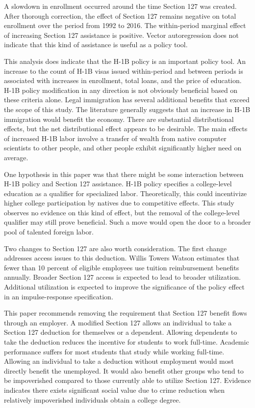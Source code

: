 \documentclass[review]{elsarticle}
\begin{document}

A slowdown in enrollment occurred around the time Section 127 was created.
After thorough correction, the effect of Section 127 remains negative on total enrollment over the period from 1992 to 2016.
The within-period marginal effect of increasing Section 127 assistance is positive.
Vector autoregression does not indicate that this kind of assistance is useful as a policy tool.

This analysis does indicate that the H-1B policy is an important policy tool.
An increase to the count of H-1B visas issued within-period and between periods is associated with increases in enrollment, total loans, and the price of education.
H-1B policy modification in any direction is not obviously beneficial based on these criteria alone.
Legal immigration has several additional benefits that exceed the scope of this study.
The literature generally suggests that an increase in H-1B immigration would benefit the economy\cite{bound2017understanding}.
There are substantial distributional effects, but the net distributional effect appears to be desirable.
The main effects of increased H-1B labor involve a transfer of wealth from native computer scientists to other people,
and other people exhibit significantly higher need on average.

One hypothesis in this paper was that there might be some interaction between H-1B policy and Section 127 assistance.
H-1B policy specifies a college-level education as a qualifier for specialized labor.
Theoretically, this could incentivize higher college participation by natives due to competitive effects.
This study observes no evidence on this kind of effect,
but the removal of the college-level qualifier may still prove beneficial.
Such a move would open the door to a broader pool of talented foreign labor.

Two changes to Section 127 are also worth consideration.
The first change addresses access issues to this deduction.
Willis Towers Watson estimates that fewer than 10 percent of eligible employees use tuition reimbursement benefits annually\cite{merrick_2019}.
Broader Section 127 access is expected to lead to broader utilization.
Additional utilization is expected to improve the significance of the policy effect in an impulse-response specification.

This paper recommends removing the requirement that Section 127 benefit flows through an employer.
A modified Section 127 allows an individual to take a Section 127 deduction for themselves or a dependent.
Allowing dependents to take the deduction reduces the incentive for students to work full-time.
Academic performance suffers for most students that study while working full-time\cite{stamour_2019}.
Allowing an individual to take a deduction without employment would most directly benefit the unemployed.
It would also benefit other groups who tend to be impoverished compared to those currently able to utilize Section 127.
Evidence indicates there exists significant social value due to crime reduction when relatively impoverished individuals obtain a college degree\cite{dennison2019crime}.
\end{document}
